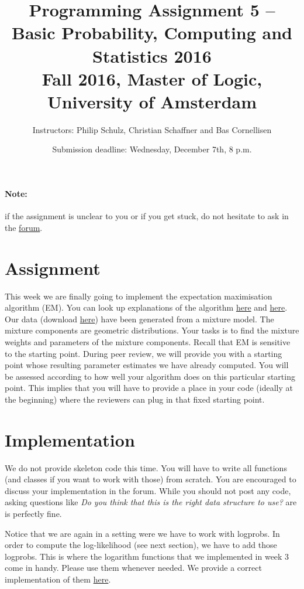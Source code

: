 \documentclass[11pt, leqno, a4paper]{article}
\title{Programming Assignment 5 -- Basic Probability, Computing and Statistics 2016 \\[2mm]
\large{Fall 2016, Master of Logic, University of Amsterdam}}
\author{Instructors: Philip Schulz, Christian Schaffner and Bas Cornellisen}
\date{Submission deadline: Wednesday, December 7th, 8 p.m.}
\begin{document}
\maketitle

\paragraph{Note:} if the assignment is unclear to you or if you get
stuck, do not hesitate to ask in the
\href{https://www.moodle.ch/lms/mod/forum/view.php?id=1721}{forum}.

\section{Assignment}

This week we are finally going to implement the expectation maximisation algorithm (EM). You can look up explanations of the algorithm 
\href{https://github.com/BasicProbability/LectureNotes/blob/master/chapter6/chapter6.pdf}{here} and 
\href{}{here}. Our data (download \href{https://github.com/BasicProbability/BasicProbability.github.io/raw/master/Homework/Programming/2016-17/Assignment5/geometric_data.txt}{here}) have been generated from a mixture model. The mixture components are geometric distributions. Your tasks is to find
the mixture weights and parameters of the mixture components. Recall that EM is sensitive to the starting point. During peer review, we will
provide you with a starting point whose resulting parameter estimates we have already computed. You will be assessed according to how well your
algorithm does on this particular starting point. This implies that you will have to provide a place in your code (ideally at the beginning) where
the reviewers can plug in that fixed starting point.

\section{Implementation}

We do not provide skeleton code this time. You will have to write all functions (and classes if you want to work with those) from scratch. You are encouraged
to discuss your implementation in the forum. While you should not post any code, asking questions like \textit{Do you think that this is the right data structure
to use?} are is perfectly fine. 

Notice that we are again in a setting were we have to work with logprobs. In order to compute the log-likelihood (see next section), we have to add those logprobs.
This is where the logarithm functions that we implemented in week 3 come in handy. Please use them whenever needed. We provide a correct implementation of
them \href{https://github.com/BasicProbability/BasicProbability.github.io/raw/master/Homework/Programming/2016-17/Assignment5/logarithms_solution.py}{here}.
\end{document}
